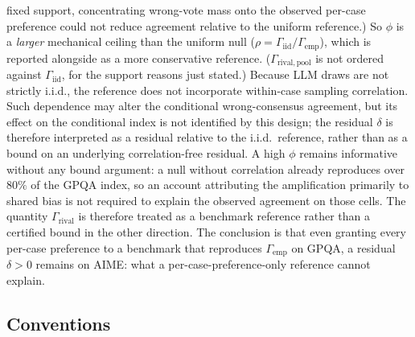 \documentclass{article}
\newcommand{\agreementIndex}{\Gamma}
\begin{document}
fixed support, concentrating wrong-vote mass onto the observed per-case
preference could not reduce agreement relative to the uniform
reference.) So $\phi$ is a
\emph{larger} mechanical ceiling than the uniform null ($\rho=\agreementIndex_{\mathrm{iid}}/\agreementIndex_{\mathrm{emp}}$),
which is reported alongside as a more conservative reference.
($\agreementIndex_{\mathrm{rival,pool}}$ is not ordered against
$\agreementIndex_{\mathrm{iid}}$, for the support reasons just stated.)
Because LLM draws are not strictly i.i.d., the reference does not
incorporate within-case sampling correlation. Such dependence may alter
the conditional wrong-consensus agreement, but its effect on the
conditional index is not identified by this design; the residual
$\delta$ is therefore interpreted as a residual relative to the i.i.d.\ 
reference, rather than as a bound on an underlying correlation-free
residual. A high $\phi$ remains informative without any bound argument:
a null without correlation already reproduces over $80\%$ of the GPQA
index, so an account attributing the amplification primarily to shared
bias is not required to explain the observed agreement on those cells.
The quantity $\agreementIndex_{\mathrm{rival}}$ is therefore treated as a
benchmark reference rather than a
certified bound in the other direction. The conclusion is that even granting every
per-case preference to a benchmark that reproduces $\agreementIndex_{\mathrm{emp}}$
on GPQA, a residual $\delta>0$ remains on AIME: what a
per-case-preference-only reference cannot explain.

\subsection{Conventions}
\label{sec:conventions}
\end{document}
